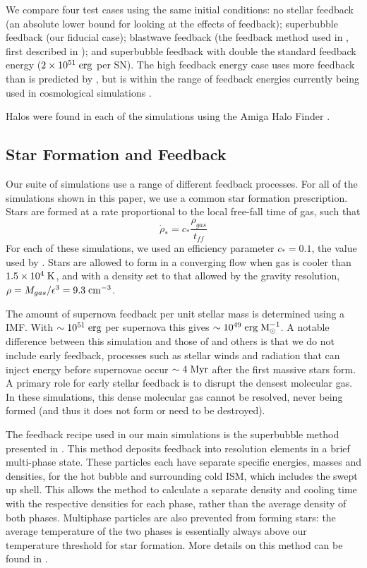 We compare four test cases using the same initial conditions: no stellar
feedback (an absolute lower bound for looking at the effects of feedback);
superbubble feedback (our fiducial case); blastwave feedback (the feedback
method used in \citet{Stinson2010}, first described in \citealt{Stinson2006}); and
superbubble feedback with double the standard feedback energy ($2\times10^{51}\;
\rm{erg}$ per SN).  The high feedback energy case uses more feedback than is
predicted by \citet{Leitherer1999}, but is within the range of feedback energies
currently being used in cosmological simulations \citep{Schaye2015, Agertz2015,
Vogelsberger2013}.  

Halos were found in each of the simulations using the Amiga Halo Finder
\citep[AHF;][]{Knollmann2009}.

\subsection{Star Formation and Feedback}
Our suite of simulations use a range of different feedback
processes.  For all of the simulations shown in this paper, we use a common
star formation prescription.  Stars are formed at a rate proportional to the
local free-fall time of gas, such that
\begin{equation}
    \dot \rho_* = c_* \frac{\rho_{gas}}{t_{ff}}
    \label{sflaw2}
\end{equation}
For each of these simulations, we used an efficiency parameter $c_* = 0.1$, the
value used by \citet{Stinson2013}.  Stars are allowed to form in a converging
flow when gas is cooler than $1.5\times10^4\; \rm{K}$, and with a density set to
that allowed by the gravity resolution, $\rho = M_{gas}/\epsilon^3 = 9.3\;
\rm{cm^{-3}}$.

The amount of supernova feedback per unit stellar mass is determined using a
\citet{Chabrier2003} IMF.  With $\sim10^{51}\; \rm{erg}$ per supernova this
gives $\sim10^{49}\; \rm{erg\;M^{-1}_{\odot}}$.   A notable difference between
this simulation and those of \citet{Stinson2013} and others is that we do not
include early feedback, processes such as stellar winds and radiation that can
inject energy before supernovae occur $\sim 4\; \rm{Myr}$ after the first
massive stars form.  A primary role for early stellar feedback is to disrupt the
densest molecular gas.  In these simulations, this dense molecular gas cannot be
resolved, never being formed (and thus it does not form or need to be
destroyed).

The feedback recipe used in our main simulations is the superbubble method
presented in \citet{Keller2014}.  This method deposits feedback into resolution
elements in a brief multi-phase state.  These particles each have separate
specific energies, masses and densities, for the hot bubble and surrounding cold
ISM, which includes the swept up shell.  This allows the method to calculate a
separate density and cooling time with the respective densities for each phase,
rather than the average density of both phases.  Multiphase particles are also
prevented from forming stars: the average temperature of the two phases is
essentially always above our temperature threshold for star formation.  More
details on this method can be found in \citet{Keller2014}.


